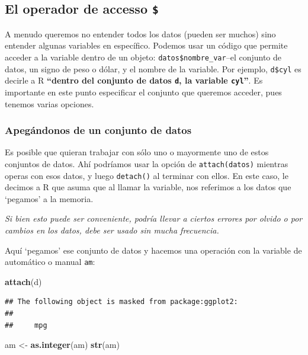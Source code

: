 \documentclass[
]{article}
\newenvironment{Shaded}{\begin{snugshade}}{\end{snugshade}}
\newcommand{\FunctionTok}[1]{\textcolor[rgb]{0.13,0.29,0.53}{\textbf{#1}}}
\newcommand{\NormalTok}[1]{#1}
\newcommand{\OtherTok}[1]{\textcolor[rgb]{0.56,0.35,0.01}{#1}}
\begin{document}
\subsection{\texorpdfstring{El operador de accesso
\texttt{\$}}{El operador de accesso \$}}\label{el-operador-de-accesso}

A menudo queremos no entender todos los datos (pueden ser muchos) sino
entender algunas variables en específico. Podemos usar un código que
permite acceder a la variable dentro de un objeto:
\texttt{datos\$nombre\_var}--el conjunto de datos, un signo de peso o
dólar, y el nombre de la variable. Por ejemplo, \texttt{d\$cyl} es
decirle a R \textbf{``dentro del conjunto de datos \texttt{d}, la
variable \texttt{cyl}''}. Es importante en este punto especificar el
conjunto que queremos acceder, pues tenemos varias opciones.

\subsubsection{Apegándonos de un conjunto de
datos}\label{apeguxe1ndonos-de-un-conjunto-de-datos}

Es posible que quieran trabajar con sólo uno o mayormente uno de estos
conjuntos de datos. Ahí podríamos usar la opción de
\texttt{attach(datos)} mientras operas con esos datos, y luego
\texttt{detach()} al terminar con ellos. En este caso, le decimos a R
que asuma que al llamar la variable, nos referimos a los datos que
`pegamos' a la memoria.

\emph{Si bien esto puede ser conveniente, podría llevar a ciertos
errores por olvido o por cambios en los datos, debe ser usado sin mucha
frecuencia.}

Aquí `pegamos' ese conjunto de datos y hacemos una operación con la
variable de automático o manual \texttt{am}:

\begin{Shaded}
\begin{Highlighting}[]
\FunctionTok{attach}\NormalTok{(d)}
\end{Highlighting}
\end{Shaded}

\begin{verbatim}
## The following object is masked from package:ggplot2:
## 
##     mpg
\end{verbatim}

\begin{Shaded}
\begin{Highlighting}[]
\NormalTok{am }\OtherTok{\textless{}{-}} \FunctionTok{as.integer}\NormalTok{(am)}
\FunctionTok{str}\NormalTok{(am)}
\end{Highlighting}
\end{Shaded}
\end{document}
